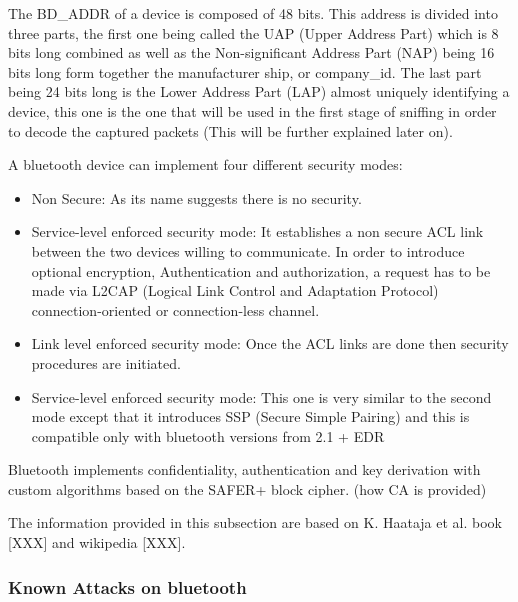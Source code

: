 The BD\_ADDR of a device is composed of 48 bits. This address is divided into three parts, the first one being called the UAP (Upper Address Part) which is 8 bits long combined as well as the Non-significant Address Part (NAP) being 16 bits long form together the manufacturer ship, or company\_id. The last part being 24 bits long is the Lower Address Part (LAP) almost uniquely identifying a device, this one is the one that will be used in the first stage of sniffing in order to decode the captured packets (This will be further explained later on). 

A bluetooth device can implement four different security modes:
  \begin{itemize}
  	\item Non Secure: As its name suggests there is no security.
  	\item Service-level enforced security mode: It establishes a non secure ACL link between the two devices willing to communicate. In order to introduce optional encryption, Authentication and authorization, a request has to be made via L2CAP (Logical Link Control and Adaptation Protocol) connection-oriented or connection-less channel.
  	\item Link level enforced security mode: Once the ACL links are done then security procedures are initiated.
  	\item Service-level enforced security mode: This one is very similar to the second mode except that it introduces SSP (Secure Simple Pairing) and this is compatible only with bluetooth versions from 2.1 + EDR
  \end{itemize}
 
Bluetooth implements confidentiality, authentication and key derivation with custom algorithms based on the SAFER+ block cipher. (how CA is provided)

The information provided in this subsection are based on K. Haataja et al. book [XXX] and wikipedia [XXX].

\subsubsection{Known Attacks on bluetooth}
















